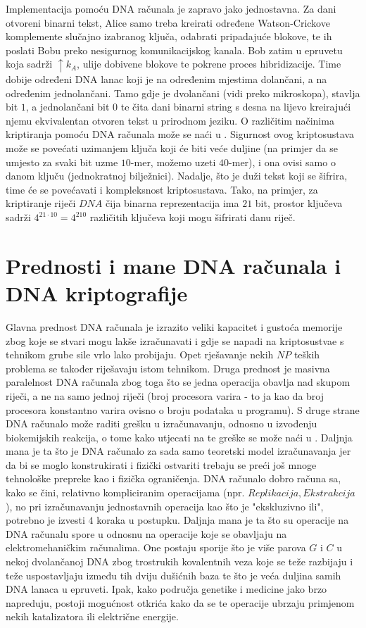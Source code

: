 \documentclass[a4paper,oneside,12pt]{memoir} %
\begin{document}
\begin{spacing}{1.5}
Implementacija pomoću DNA računala je zapravo jako jednostavna. Za dani otvoreni binarni tekst, Alice samo treba kreirati određene Watson-Crickove komplemente slučajno izabranog ključa, odabrati pripadajuće blokove, te ih poslati Bobu preko nesigurnog komunikacijskog kanala. Bob zatim u epruvetu koja sadrži $\uparrow k_A$, ulije dobivene blokove te pokrene proces hibridizacije. Time dobije određeni DNA lanac koji je na određenim mjestima dolančani, a na određenim jednolančani. Tamo gdje je dvolančani (vidi preko mikroskopa), stavlja bit $1$, a jednolančani bit $0$ te čita dani binarni string s desna na lijevo kreirajući njemu ekvivalentan otvoren tekst u prirodnom jeziku. O različitim načinima kriptiranja pomoću DNA računala može se naći u \cite{borda2011fundamentals}. 
Sigurnost ovog kriptosustava može se povećati uzimanjem ključa koji će biti veće duljine (na primjer da se umjesto za svaki bit uzme $10$-mer, možemo uzeti $40$-mer), i ona ovisi samo o danom ključu (jednokratnoj bilježnici). Nadalje, što je duži tekst koji se šifrira, time će se povećavati i kompleksnost kriptosustava. Tako, na primjer, za kriptiranje riječi $DNA$ čija binarna reprezentacija ima $21$ bit, prostor ključeva sadrži $4^{21\cdot 10}=4^{210}$ različitih ključeva koji mogu šifrirati danu riječ. 
\section{Prednosti i mane DNA računala i DNA kriptografije}
Glavna prednost DNA računala je izrazito veliki kapacitet i gustoća memorije zbog koje se stvari mogu lakše izračunavati i gdje se napadi na kriptosustvae s tehnikom grube sile vrlo lako probijaju. Opet rješavanje nekih $NP$ teških problema se također riješavaju istom tehnikom. Druga prednost je masivna paralelnost DNA računala zbog  toga što se jedna operacija obavlja nad skupom riječi, a ne na samo jednoj riječi (broj procesora varira - to ja kao da broj procesora konstantno varira ovisno o broju podataka u programu). S druge strane DNA računalo može raditi grešku u izračunavanju, odnosno u izvođenju biokemijskih reakcija, o tome kako utjecati na te greške se može naći u \cite{DNAerr}. Daljnja mana je ta što je DNA računalo za sada samo teoretski model izračunavanja jer da bi se moglo konstrukirati i fizički ostvariti trebaju se preći još mnoge tehnološke prepreke kao i fizička ograničenja. DNA računalo dobro računa sa, kako se čini, relativno kompliciranim operacijama (npr. $Replikacija, Ekstrakcija$), no pri izračunavanju jednostavnih operacija kao što je "ekskluzivno ili", potrebno je izvesti $4$ koraka u postupku. Daljnja mana je ta što su operacije na DNA računalu spore u odnosnu na operacije koje se obavljaju na elektromehaničkim računalima. One postaju sporije što je više parova $G$ i $C$ u nekoj dvolančanoj DNA zbog trostrukih kovalentnih veza koje se teže razbijaju i teže uspostavljaju između tih dviju dušićnih baza te što je veća duljina samih DNA lanaca u epruveti. Ipak, kako područja genetike i medicine jako brzo napreduju, postoji mogućnost otkrića kako da se te operacije ubrzaju primjenom nekih katalizatora ili električne energije. 

\newpage
\nocite{*}


\end{spacing}
\end{document}
